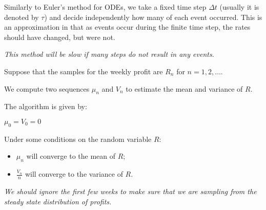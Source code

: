 \begin{SaveDefinition}[key=tau-leaping, title={$\pmb{\tau}$-leaping Method}]

Similarly to Euler's method for ODEs, we take a fixed time step $\Delta t$ (usually it is denoted by $\tau$) and decide independently how many of each event occurred. This is an approximation in that as events occur during the finite time step, the rates should have changed, but were not.
	
\textit{This method will be slow if many steps do not result in any events.}	
\end{SaveDefinition}




\begin{SaveDefinition}[key=WelfordAlgorithm, title ={Welford's Algorithm}]


Suppose that the samples for the weekly profit are $R_n$ for $n=1, 2, \ldots$.

We compute two sequences $\mu_n$ and $V_n$ to estimate the mean and variance of $R$.

The algorithm is given by:

\begin{algorithm}[H]
    $\mu_0 = V_0 = 0$\; 
	\SetAlgoLined\SetArgSty{}
\end{algorithm}

Under some conditions on the random variable $R$:
\begin{itemize}
	\item $\mu_n$ will converge to the mean of $R$;
	\item $\frac{V_n}{n}$ will converge to the variance of $R$.
\end{itemize}

\textit{We should ignore the first few weeks to make sure that we are sampling from the steady state distribution of profits.}
\end{SaveDefinition}

